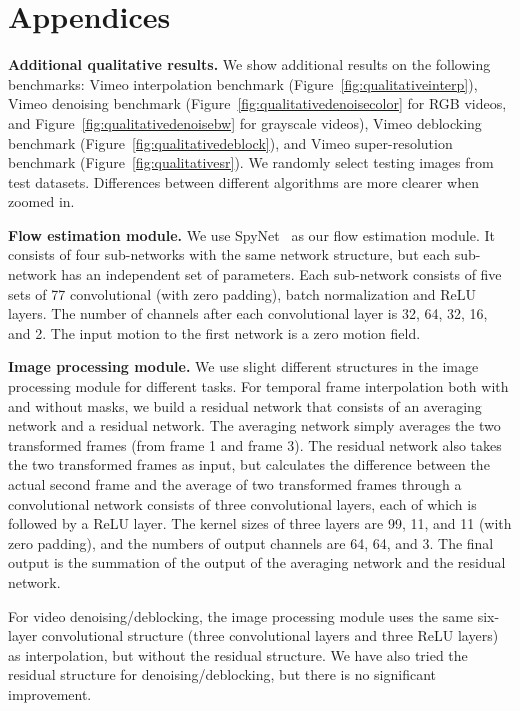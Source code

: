 \documentclass[twocolumn,natbib]{svjour3}          \smartqed  \usepackage{graphicx}
\newcommand{\fig}[1]{Figure~\ref{#1}}
\newcommand{\myparagraph}[1]{\vspace{5pt}\noindent\textbf{#1}}
\begin{document}
\newpage
\section*{Appendices}

\myparagraph{Additional qualitative results. } We show additional results on the following benchmarks: Vimeo interpolation benchmark (\fig{fig:qualitativeinterp}), Vimeo denoising benchmark (\fig{fig:qualitativedenoisecolor} for RGB videos, and \fig{fig:qualitativedenoisebw} for grayscale videos), Vimeo deblocking benchmark (\fig{fig:qualitativedeblock}), and Vimeo super-resolution benchmark (\fig{fig:qualitativesr}). We randomly select testing images from test datasets. Differences between different algorithms are more clearer when zoomed in.

\myparagraph{Flow estimation module. } We use SpyNet~\citep{Ranjan2017Optical} as our flow estimation module. It consists of four sub-networks with the same network structure, but each sub-network has an independent set of parameters.  Each sub-network consists of five sets of 77 convolutional (with zero padding), batch normalization and ReLU layers. The number of channels after each convolutional layer is 32, 64, 32, 16, and 2. The input motion to the first network is a zero motion field.

\myparagraph{Image processing module. } We use slight different structures in the image processing module for different tasks. For temporal frame interpolation both with and without masks, we build a residual network that consists of an averaging network and a residual network. The averaging network simply averages the two transformed frames (from frame 1 and frame 3).
The residual network also takes the two transformed frames as input, but calculates the difference between the actual second frame and the average of two transformed frames through a convolutional network consists of three convolutional layers, each of which is followed by a ReLU layer. The kernel sizes of three layers are 99, 11, and 11 (with zero padding), and the numbers of output channels are 64, 64, and 3. The final output is the summation of the output of the averaging network and the residual network.

For video denoising/deblocking, the image processing module uses the same six-layer convolutional structure (three convolutional layers and three ReLU layers) as interpolation, but without the residual structure. We have also tried the residual structure for denoising/deblocking, but there is no significant improvement.
\end{document}
